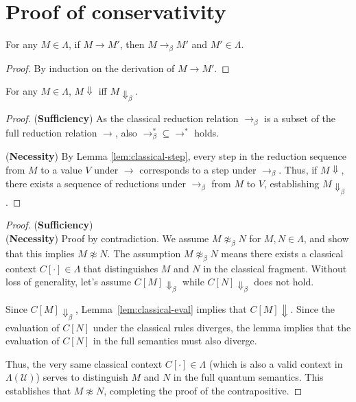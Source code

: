 \section{Proof of conservativity}
\begin{lem} \label{lem:classical-step}
  For any $M \in \Lambda$, if $M \longrightarrow M'$, then $M \longrightarrow_\beta M'$ and $M' \in \Lambda$.
\end{lem}
\begin{proof}
  By induction on the derivation of $M \longrightarrow M'$.
\end{proof}

\begin{lem} \label{lem:classical-eval}
  For any $M \in \Lambda$, $M \Downarrow$ iff $M \Downarrow_\beta$.
\end{lem}
\begin{proof}
  (\textbf{Sufficiency})
  As the classical reduction relation $\longrightarrow_\beta$ is a subset of the full reduction relation $\longrightarrow$, also $\longrightarrow_\beta^* \subseteq \longrightarrow^*$ holds.

  (\textbf{Necessity})
  By Lemma \ref{lem:classical-step}, every step in the reduction sequence from $M$ to a value $V$ under $\longrightarrow$ corresponds to a step under $\longrightarrow_\beta$.
  Thus, if $M \Downarrow$, there exists a sequence of reductions under $\longrightarrow_\beta$ from $M$ to $V$, establishing $M \Downarrow_\beta$.
\end{proof}

\ConservTheorem*
\begin{proof}[Proof]
  (\textbf{Sufficiency})
  \\
  (\textbf{Necessity})
  Proof by contradiction.
  We assume $M \not\approx_{\beta} N$ for $M, N \in \Lambda$, and show that this implies $M \not\approx N$.
  The assumption $M \not\approx_{\beta} N$ means there exists a classical context $C[\cdot] \in \Lambda$ that distinguishes $M$ and $N$ in the classical fragment.
  Without loss of generality, let's assume $C[M] \Downarrow_\beta$ while $C[N] \Downarrow_\beta$ does not hold.

  Since $C[M] \Downarrow_\beta$, Lemma~\ref{lem:classical-eval} implies that $C[M] \Downarrow$.
  Since the evaluation of $C[N]$ under the classical rules diverges, the lemma implies that the evaluation of $C[N]$ in the full semantics must also diverge.

  Thus, the very same classical context $C[\cdot] \in \Lambda$ (which is also a valid context in $\Lambda(\mathcal{U})$) serves to distinguish $M$ and $N$ in the full quantum semantics.
  This establishes that $M \not\approx N$, completing the proof of the contrapositive.
\end{proof}